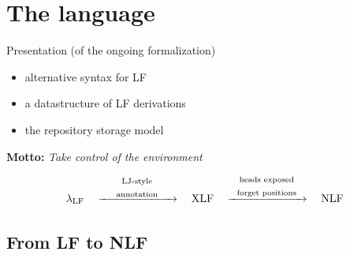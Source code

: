 \documentclass[ignorenonframetext,red]{beamer}
\begin{document}
\section{The language}

\begin{frame}{Presentation (of the ongoing formalization)}
  \begin{itemize}
  \item alternative syntax for LF
  \item a datastructure of LF derivations
  \item the repository storage model
  \end{itemize}
  \vspace{2em}
  \begin{center}
    \textbf{Motto: }{\large \it Take control of the environment}
  \end{center}
  \vspace{3em}
  \large
  \[
  \lambda_{\text{LF}}
  \quad\xrightarrow{\text{
      \begin{minipage}{20ex}
        \begin{center}
          LJ-style\\
          annotation
        \end{center}
      \end{minipage}
    }}\quad
  \text{XLF}
  \quad\xrightarrow{\text{
      \begin{minipage}{20ex}
        \begin{center}
          heads exposed\\
          forget positions
        \end{center}
      \end{minipage}
    }}\quad
  \text{NLF}
  \]
\end{frame}

\subsection{From LF to NLF}
\end{document}
